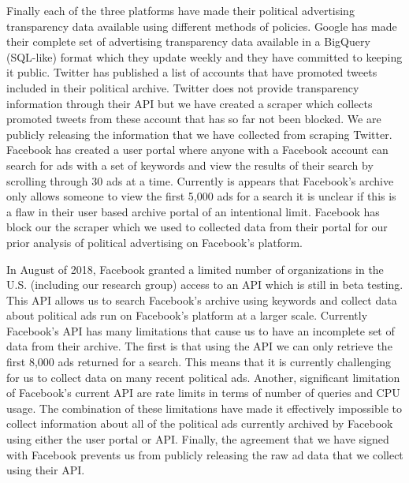 \documentclass[fleqn,10pt]{wlscirep}
\begin{document}
Finally each of the three platforms have made their political advertising transparency data available using different methods of policies. Google has made their complete set of advertising transparency data available in a BigQuery (SQL-like) format which they update weekly and they have committed to keeping it public. Twitter has published a list of accounts that have promoted tweets included in their political archive. Twitter does not provide transparency information through their API but we have created a scraper which collects promoted tweets from these account that has so far not been blocked. We are publicly releasing the information that we have collected from scraping Twitter. Facebook has created a user portal where anyone with a Facebook account can search for ads with a set of keywords and view the results of their search by scrolling through 30 ads at a time. Currently is appears that Facebook's archive only allows someone to view the first 5,000 ads for a search it is unclear if this is a flaw in their user based archive portal of an intentional limit. Facebook has block our the scraper which we used to collected data from their portal for our prior analysis of political advertising on Facebook's platform. 

In August of 2018, Facebook granted a limited number of organizations in the U.S. (including our research group) access to an API which is still in beta testing. This API allows us to search Facebook's archive using keywords and collect data about political ads run on Facebook's platform at a larger scale. Currently Facebook's API has many limitations that cause us to have an incomplete set of data from their archive. The first is that using the API we can only retrieve the first 8,000 ads returned for a search. This means that it is currently challenging for us to collect data on many recent political ads. Another, significant limitation of Facebook's current API are rate limits in terms of number of queries and CPU usage. The combination of these limitations have made it effectively impossible to collect information about all of the political ads currently archived by Facebook using either the user portal or API. Finally, the agreement that we have signed with Facebook prevents us from publicly releasing the raw ad data that we collect using their API. 
\end{document}
